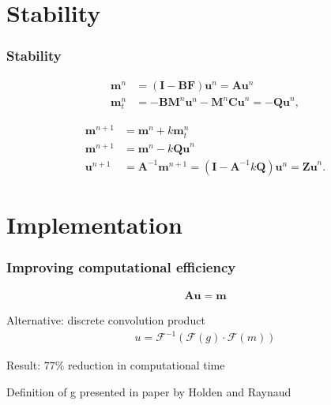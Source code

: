 \documentclass{beamer}
\begin{document}
\section*{Stability}
\begin{frame}
\frametitle{Stability}
\begin{align*}
\bm{m}^n &= (\bm{I}-\bm{BF})\bm{u}^n = \bm{A} \bm{u}^n \\
\bm{m}^n_t &= -\bm{BM}^n \bm{u}^n - \bm{M}^n\bm{Cu}^n = \bm{-Qu}^n,
\end{align*}

\begin{align*}
\bm{m}^{n+1} &= \bm{m}^n + k\bm{m}^n_t \\
\bm{m}^{n+1} &= \bm{m}^n - k\bm{Qu}^n \\
\bm{u}^{n+1} &= \bm{A}^{-1} \bm{m}^{n+1} = \left(\bm{I} -\bm{A}^{-1} k\bm{Q}\right)\bm{u}^n = \bm{Zu}^n.
\end{align*}
\end{frame}

\section*{Implementation}
\begin{frame}
\frametitle{Improving computational efficiency}

\begin{align*}
\bm{Au} = \bm{m}
\end{align*}

Alternative: discrete convolution product
\begin{align*}
u = \mathcal{F}^{-1} (\mathcal{F} (g) \cdot \mathcal{F}(m))
\end{align*}

Result: $77\%$ reduction in computational time

\vspace{2cm}
\tiny{Definition of g presented in paper by Holden and Raynaud}
\end{frame}
\end{document}
